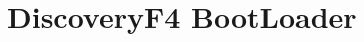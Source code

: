 \hypertarget{group___discovery_f4_b_l}{\section{Discovery\-F4 Boot\-Loader}
\label{group___discovery_f4_b_l}
}
